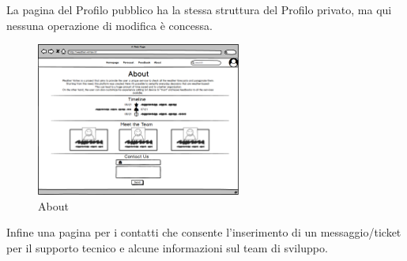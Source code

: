 La pagina del Profilo pubblico ha la stessa struttura del Profilo privato, ma qui nessuna operazione di modifica è concessa.

\begin{figure}[H]
    \caption{About}
    \label{fig:About}
    \centering
    \includegraphics[width=0.6\textwidth]{MockUps/about.png}
\end{figure}
Infine una pagina per i contatti che consente l'inserimento di un messaggio/ticket
per il supporto tecnico e alcune informazioni sul team di sviluppo.

